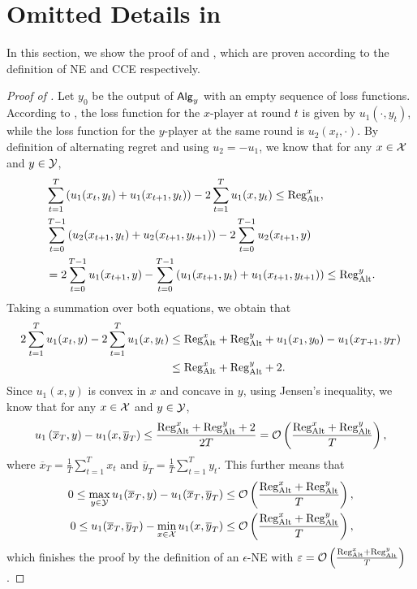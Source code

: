 \section{Omitted Details in }\label{app:alt-game}
In this section, we show the proof of  and , which are proven according to the definition of NE and CCE respectively. 

\begin{proof}[Proof of ]
    Let $y_0$ be the output of ${\mathsf{Alg}}_y$ with an empty sequence of loss functions. According to , the loss function for the \( x \)-player at round \( t \) is given by \( u_1(\cdot, y_t) \), while the loss function for the \( y \)-player at the same round is $ u_2(x_t, \cdot)$.
    By definition of alternating regret and using $u_2=-u_1$, we know that for any $x\in{\mathcal{X}}$ and $y\in{\mathcal{Y}}$,
    \begin{align*}
        &\sum_{t=1}^T\left(u_1(x_t,y_t)+u_1(x_{t+1},y_t)\right) - 2\sum_{t=1}^T u_1(x,y_t)\leq \mathrm{Reg}_{\mathrm{Alt}}^x,\\
        &\sum_{t=0}^{T-1}\left(u_2(x_{t+1},y_{t})+u_2(x_{t+1},y_{t+1})\right) - 2\sum_{t=0}^{T-1} u_2(x_{t+1},y)\\
        &=2\sum_{t=0}^{T-1} u_1(x_{t+1},y) - \sum_{t=0}^{T-1}\left(u_1(x_{t+1},y_{t})+u_1(x_{t+1},y_{t+1})\right)\leq \mathrm{Reg}_{\mathrm{Alt}}^y.
    \end{align*}
    Taking a summation over both equations, we obtain that
    \begin{align*}
        2\sum_{t=1}^{T} u_1(x_{t},y) - 2\sum_{t=1}^T u_1(x,y_t)&\leq \mathrm{Reg}_{\mathrm{Alt}}^x + \mathrm{Reg}_{\mathrm{Alt}}^y+u_1(x_1,y_0)-u_1(x_{T+1},y_T)\\
        &\leq \mathrm{Reg}_{\mathrm{Alt}}^x + \mathrm{Reg}_{\mathrm{Alt}}^y + 2.
    \end{align*}
    Since $u_1(x,y)$ is convex in $x$ and concave in $y$, using Jensen's inequality, we know that for any $x\in{\mathcal{X}}$ and $y\in{\mathcal{Y}}$,
    \begin{align*}
        u_1\left(\overline{x}_T,y\right) - u_1(x,\overline{y}_T) \leq \frac{\mathrm{Reg}_{\mathrm{Alt}}^x + \mathrm{Reg}_{\mathrm{Alt}}^y + 2}{2T} = \mathcal{O}\left(\frac{\mathrm{Reg}_{\mathrm{Alt}}^x + \mathrm{Reg}_{\mathrm{Alt}}^y}{T}\right),
    \end{align*}
    where $\overline{x}_T=\frac{1}{T}\sum_{t=1}^Tx_t$ and $\overline{y}_T=\frac{1}{T}\sum_{t=1}^Ty_t$. This further means that
    \begin{align*}
        0\leq \max_{y\in{\mathcal{Y}}}u_1(\overline{x}_T,y)-u_1(\overline{x}_T,\overline{y}_T) \leq \mathcal{O}\left(\frac{\mathrm{Reg}_{\mathrm{Alt}}^x + \mathrm{Reg}_{\mathrm{Alt}}^y}{T}\right), \\
        0\leq u_1(\overline{x}_T,\overline{y}_T) - \min_{x\in{\mathcal{X}}}u_1(x,\overline{y}_T) \leq \mathcal{O}\left(\frac{\mathrm{Reg}_{\mathrm{Alt}}^x + \mathrm{Reg}_{\mathrm{Alt}}^y}{T}\right),
    \end{align*}
    which finishes the proof by the definition of an $\epsilon$-NE with $\varepsilon=\mathcal{O}\left(\frac{\mathrm{Reg}_{\mathrm{Alt}}^x + \mathrm{Reg}_{\mathrm{Alt}}^y}{T}\right)$.
\end{proof}


